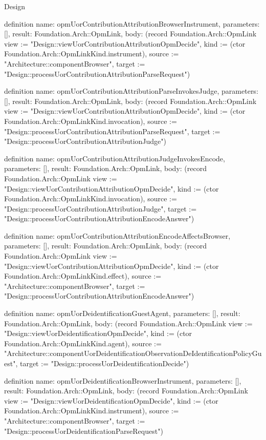 \begin{lexlean}{Design}
\begin{semanticmodule}
definition{
  name: opmUorContributionAttributionBrowserInstrument,
  parameters: [],
  result: Foundation.Arch::OpmLink,
  body: (record Foundation.Arch::OpmLink {view := "Design::viewUorContributionAttributionOpmDecide", kind := (ctor Foundation.Arch::OpmLinkKind.instrument), source := "Architecture::componentBrowser", target := "Design::processUorContributionAttributionParseRequest"})
}

definition{
  name: opmUorContributionAttributionParseInvokesJudge,
  parameters: [],
  result: Foundation.Arch::OpmLink,
  body: (record Foundation.Arch::OpmLink {view := "Design::viewUorContributionAttributionOpmDecide", kind := (ctor Foundation.Arch::OpmLinkKind.invocation), source := "Design::processUorContributionAttributionParseRequest", target := "Design::processUorContributionAttributionJudge"})
}

definition{
  name: opmUorContributionAttributionJudgeInvokesEncode,
  parameters: [],
  result: Foundation.Arch::OpmLink,
  body: (record Foundation.Arch::OpmLink {view := "Design::viewUorContributionAttributionOpmDecide", kind := (ctor Foundation.Arch::OpmLinkKind.invocation), source := "Design::processUorContributionAttributionJudge", target := "Design::processUorContributionAttributionEncodeAnswer"})
}

definition{
  name: opmUorContributionAttributionEncodeAffectsBrowser,
  parameters: [],
  result: Foundation.Arch::OpmLink,
  body: (record Foundation.Arch::OpmLink {view := "Design::viewUorContributionAttributionOpmDecide", kind := (ctor Foundation.Arch::OpmLinkKind.effect), source := "Architecture::componentBrowser", target := "Design::processUorContributionAttributionEncodeAnswer"})
}

definition{
  name: opmUorDeidentificationGuestAgent,
  parameters: [],
  result: Foundation.Arch::OpmLink,
  body: (record Foundation.Arch::OpmLink {view := "Design::viewUorDeidentificationOpmDecide", kind := (ctor Foundation.Arch::OpmLinkKind.agent), source := "Architecture::componentUorDeidentificationObservationDeIdentificationPolicyGuest", target := "Design::processUorDeidentificationDecide"})
}

definition{
  name: opmUorDeidentificationBrowserInstrument,
  parameters: [],
  result: Foundation.Arch::OpmLink,
  body: (record Foundation.Arch::OpmLink {view := "Design::viewUorDeidentificationOpmDecide", kind := (ctor Foundation.Arch::OpmLinkKind.instrument), source := "Architecture::componentBrowser", target := "Design::processUorDeidentificationParseRequest"})
}


\end{semanticmodule}
\end{lexlean}
